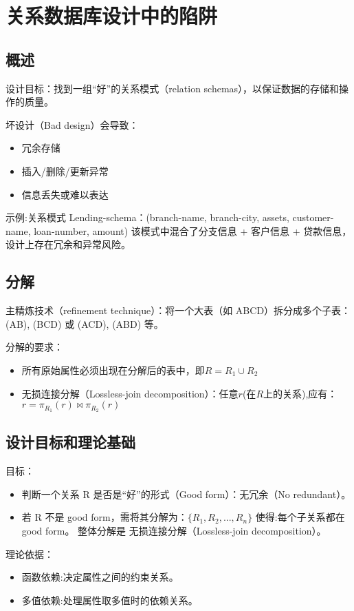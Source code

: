 \section{关系数据库设计中的陷阱}

\subsection{概述}

设计目标：找到一组“好”的关系模式（relation schemas），以保证数据的存储和操作的质量。

坏设计（Bad design）会导致：
\begin{itemize}
    \item 冗余存储
    \item 插入/删除/更新异常
    \item 信息丢失或难以表达
\end{itemize}

示例:关系模式 Lending-schema：(branch-name, branch-city, assets, customer-name, loan-number, amount)
该模式中混合了分支信息 + 客户信息 + 贷款信息，设计上存在冗余和异常风险。

\subsection{分解}

主精炼技术（refinement technique）：将一个大表（如 ABCD）拆分成多个子表：(AB), (BCD) 或 (ACD), (ABD) 等。

分解的要求：
\begin{itemize}
    \item 所有原始属性必须出现在分解后的表中，即$R=R_1\cup R_2$
    \item 无损连接分解（Lossless-join decomposition）：任意$r$(在$R$上的关系),应有：$r=\pi_{R_1}(r)\Join \pi_{R_2}(r)$
\end{itemize}

\subsection{设计目标和理论基础}

目标：
\begin{itemize}
    \item 判断一个关系 R 是否是“好”的形式（Good form）：无冗余（No redundant）。
    \item 若 R 不是 good form，需将其分解为：$\{R_1,R_2,...,R_n\}$
       使得:每个子关系都在 good form。
       整体分解是 无损连接分解（Lossless-join decomposition）。
\end{itemize}

理论依据：
\begin{itemize}
    \item 函数依赖:决定属性之间的约束关系。
    \item 多值依赖:处理属性取多值时的依赖关系。
\end{itemize}